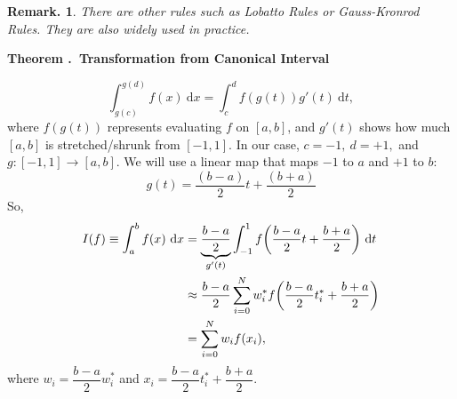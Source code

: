 \documentclass[12pt, a4paper]{article}
\newcounter{index}[subsection]
\newenvironment*{thm}[1]{\begin{tcolorbox}\par\noindent\textbf{Theorem \thesubsection.\stepcounter{index}\theindex\ #1} \par}{\par\end{tcolorbox}}
\newtheorem{rmk}{Remark.}[section]
\def\d{{\mathrm{d}}}
\begin{document}
\begin{rmk}
	There are other rules such as Lobatto Rules or Gauss-Kronrod Rules. They are also widely used in practice.	
\end{rmk}
\begin{thm}{Transformation from Canonical Interval}
	\[\int_{g(c)}^{g(d)}f(x)\ \d{x}=\int_c^df(g(t))g'(t)\ \d{t},\]	where $f(g(t))$ represents evaluating $f$ on $[a,b]$, and $g'(t)$ shows how much $[a,b]$ is stretched/shrunk from $[-1,1]$. In our case, $c=-1,\ d=+1,$ and $g:[-1,1]\to[a,b]$. We will use a linear map that maps $-1$ to $a$ and $+1$ to $b$: \[g(t)=\dfrac{(b-a)}{2}t+\dfrac{(b+a)}{2}\] So, \begin{align*}I(f)\equiv\int_a^bf(x)\ \d{x}&=\underbrace{\dfrac{b-a}{2}}_{g'(t)}\int_{-1}^1f\qty(\dfrac{b-a}{2}t+\dfrac{b+a}{2})\ \d{t}\\&\approx\dfrac{b-a}{2}\sum_{i=0}^Nw_i^*f\qty(\dfrac{b-a}{2}t_i^*+\dfrac{b+a}{2})\\&=\sum_{i=0}^Nw_if(x_i),\end{align*} where $w_i=\dfrac{b-a}{2}w_i^*$ and $x_i=\dfrac{b-a}{2}t_i^*+\dfrac{b+a}{2}$.

\end{thm}
\end{document}
